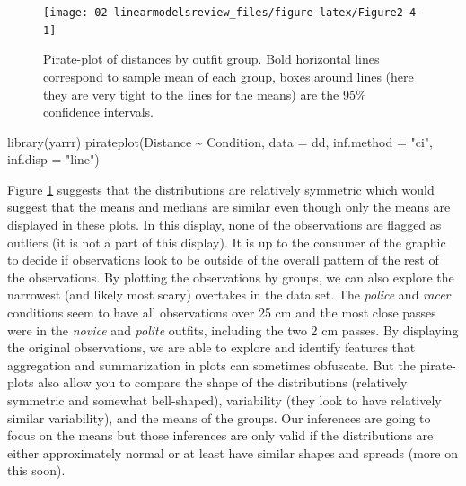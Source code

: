 \documentclass[
]{book}
\newenvironment{Shaded}{\begin{snugshade}}{\end{snugshade}}
\newcommand{\AttributeTok}[1]{\textcolor[rgb]{0.77,0.63,0.00}{#1}}
\newcommand{\FunctionTok}[1]{\textcolor[rgb]{0.00,0.00,0.00}{#1}}
\newcommand{\NormalTok}[1]{#1}
\newcommand{\SpecialCharTok}[1]{\textcolor[rgb]{0.00,0.00,0.00}{#1}}
\newcommand{\StringTok}[1]{\textcolor[rgb]{0.31,0.60,0.02}{#1}}
\begin{document}
\begin{figure}[ht!]

{\centering \texttt{[image: 02-linearmodelsreview\_files/figure-latex/Figure2-4-1]} 

}

\caption{Pirate-plot of distances by outfit group. Bold horizontal lines correspond to sample mean of each group, boxes around lines (here they are very tight to the lines for the means) are the 95\% confidence intervals.}\label{fig:Figure2-4}
\end{figure}

\begin{Shaded}
\begin{Highlighting}[]
\FunctionTok{library}\NormalTok{(yarrr)}
\FunctionTok{pirateplot}\NormalTok{(Distance }\SpecialCharTok{\textasciitilde{}}\NormalTok{ Condition, }\AttributeTok{data =}\NormalTok{ dd, }\AttributeTok{inf.method =} \StringTok{"ci"}\NormalTok{, }\AttributeTok{inf.disp =} \StringTok{"line"}\NormalTok{)}
\end{Highlighting}
\end{Shaded}

Figure \ref{fig:Figure2-4} suggests that the distributions are relatively symmetric which would suggest that the means and medians are similar even though only the means are displayed in these plots. In this display, none of the observations are flagged as outliers (it is not a part of this display). It is up to the consumer of the graphic to decide if observations look to be outside of the overall pattern of the rest of the observations. By plotting the observations by groups, we can also explore the narrowest (and likely most scary) overtakes in the data set. The \emph{police} and \emph{racer} conditions seem to have all observations over 25 cm and the most close passes were in the \emph{novice} and \emph{polite} outfits, including the two 2 cm passes. By displaying the original observations, we are able to explore and identify features that aggregation and summarization in plots can sometimes obfuscate. But the pirate-plots also allow you to compare the shape of the distributions (relatively symmetric and somewhat bell-shaped), variability (they look to have relatively similar variability), and the means of the groups. Our inferences are going to focus on the means but those inferences are only valid if the distributions are either approximately normal or at least have similar shapes and spreads (more on this soon).
\end{document}
